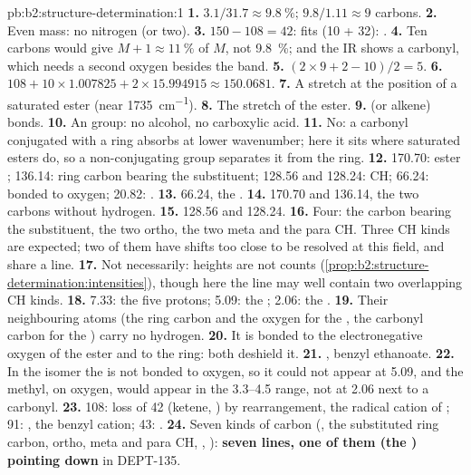 \begin{solution}{pb:b2:structure-determination:1}
\textbf{1.} $3.1/31.7 \approx 9.8~\%$; $9.8/1.11 \approx 9$ carbons.
\textbf{2.} Even mass: no nitrogen (or two).
\textbf{3.} $150 - 108 = 42$:  fits (10 + 32): .
\textbf{4.} Ten carbons would give $M+1 \approx 11~\%$ of $M$, not 9.8~\%; and the IR shows a
carbonyl, which needs a second oxygen besides the  band.
\textbf{5.} $(2 \times 9 + 2 - 10)/2 = 5$.
\textbf{6.} $108 + 10 \times 1.007825 + 2 \times 15.994915 \approx 150.0681$.
\textbf{7.} A  stretch at the position of a saturated ester (near \qty{1735}{cm^{-1}}).
\textbf{8.} The  stretch of the ester.
\textbf{9.}  (or alkene)  bonds.
\textbf{10.} An  group: no alcohol, no carboxylic acid.
\textbf{11.} No: a carbonyl conjugated with a ring absorbs at lower wavenumber; here it sits where
saturated esters do, so a non-conjugating group separates it from the ring.
\textbf{12.} 170.70: ester ; 136.14: ring carbon bearing the substituent; 128.56 and 128.24:
 CH; 66.24:  bonded to oxygen; 20.82: .
\textbf{13.} 66.24, the .
\textbf{14.} 170.70 and 136.14, the two carbons without hydrogen.
\textbf{15.} 128.56 and 128.24.
\textbf{16.} Four: the carbon bearing the substituent, the two ortho, the two meta and the para CH. Three
CH kinds are expected; two of them have shifts too close to be resolved at this field, and share a line.
\textbf{17.} Not necessarily: heights are not counts (\cref{prop:b2:structure-determination:intensities}),
though here the line may well contain two overlapping CH kinds.
\textbf{18.} 7.33: the five  protons; 5.09: the ; 2.06: the .
\textbf{19.} Their neighbouring atoms (the ring carbon and the oxygen for the , the carbonyl
carbon for the ) carry no hydrogen.
\textbf{20.} It is bonded to the electronegative oxygen of the ester and to the ring: both deshield it.
\textbf{21.} , benzyl ethanoate.
\textbf{22.} In the isomer the  is not bonded to oxygen, so it could not appear at 5.09, and the
methyl, on oxygen, would appear in the 3.3--4.5 range, not at 2.06 next to a carbonyl.
\textbf{23.} 108: loss of 42 (ketene, ) by rearrangement, the radical cation of
; 91: , the benzyl cation; 43: .
\textbf{24.} Seven kinds of carbon (, the substituted ring carbon, ortho, meta and para CH,
, ): \textbf{seven lines, one of them (the ) pointing down} in DEPT-135.
\end{solution}
